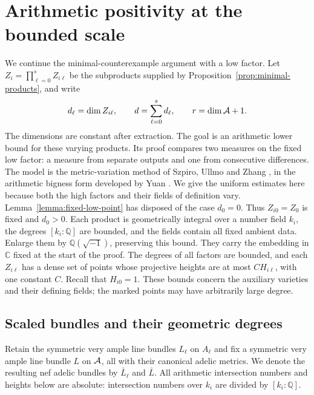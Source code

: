 \section{Arithmetic positivity at the bounded scale}
\label{sec:arithmetic}

We continue the minimal-counterexample argument with a low factor.  Let
\(Z_i=\prod_{\ell=0}^s Z_{i\ell}\) be the subproducts supplied by
Proposition~\ref{prop:minimal-products}, and write
\[
 d_\ell=\dim Z_{i\ell},\qquad d=\sum_{\ell=0}^s d_\ell,
 \qquad r=\dim\mathcal A+1.
\]
The dimensions are constant after extraction.
The goal is an arithmetic lower bound for these varying products. Its
proof compares two measures on the fixed low factor: a measure from
separate outputs and one from consecutive differences. The model is the
metric-variation method of Szpiro, Ullmo and Zhang
\cite[Theorem~3.1 and its proof]{SzpiroUllmoZhang1997}, in the arithmetic
bigness form developed by Yuan \cite[Section~3.2]{Yuan2008}. We give the
uniform estimates here because both the high factors and their fields
of definition vary.  Lemma~\ref{lemma:fixed-low-point}
has disposed of the case \(d_0=0\).  Thus
\(Z_{i0}=Z_0\) is fixed and \(d_0>0\).  Each product is geometrically
integral over a number field \(k_i\), the degrees \([k_i:\mathbb Q]\)
are bounded, and the fields contain all fixed ambient data.  Enlarge them
by \(\mathbb Q(\sqrt{-1})\), preserving this bound.  They carry the
embedding in \(\mathbb C\) fixed at the start of the proof.  The degrees
of all factors are bounded, and each \(Z_{i\ell}\) has a dense set of
points whose projective heights are at most \(C H_{i\ell}\), with one
constant \(C\).  Recall that \(H_{i0}=1\).  These bounds concern the
auxiliary varieties and their defining fields; the marked points may have
arbitrarily large degree.

\subsection{Scaled bundles and their geometric degrees}

Retain the symmetric very ample line bundles \(L_\ell\) on \(A_\ell\)
and fix a symmetric very ample line bundle \(L\) on \(\mathcal A\), all with their
canonical adelic metrics.  We denote the resulting
nef adelic bundles by \(\bar L_\ell\) and \(\bar L\).  All arithmetic
intersection numbers and heights below are absolute: intersection numbers
over \(k_i\) are divided by \([k_i:\mathbb Q]\).

